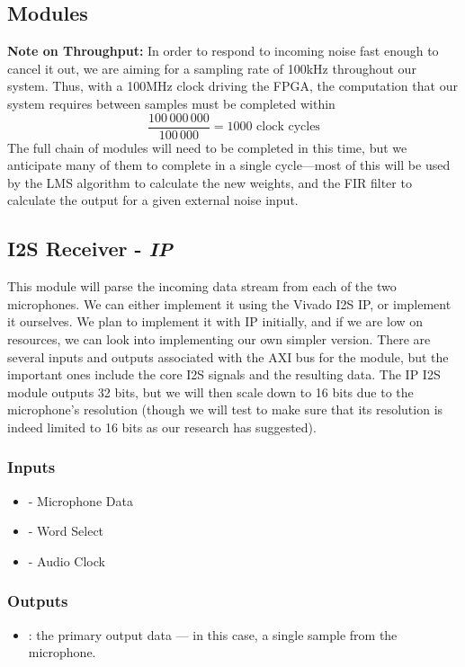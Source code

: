 \documentclass{fpgairpods}
\begin{document}
\newpage
\begin{multicols*}{2}
\section{Modules}
\textbf{Note on Throughput:} In order to respond to incoming noise fast enough to cancel it out, we are aiming for a sampling rate of 100kHz throughout our system. Thus, with a 100MHz clock driving the FPGA, the computation that our system requires between samples must be completed within
\[ \frac{100\,000\,000}{100\,000} = 1000 \text{ clock cycles} \]
The full chain of modules will need to be completed in this time, but we anticipate many of them to complete in a single cycle---most of this will be used by the LMS algorithm to calculate the new weights, and the FIR filter to calculate the output for a given external noise input.


\subsection{I2S Receiver - \textit{IP}}
This module will parse the incoming data stream from each of the two microphones. We can either implement it using the Vivado I2S IP, or implement it ourselves. We plan to implement it with IP initially, and if we are low on resources, we can look into implementing our own simpler version. There are several inputs and outputs associated with the AXI bus for the module, but the important ones include the core I2S signals and the resulting data. The IP I2S module outputs 32 bits, but we will then scale down to 16 bits due to the microphone's resolution (though we will test to make sure that its resolution is indeed limited to 16 bits as our research has suggested). 
\subsubsection{Inputs}
\begin{itemize}
    \item {} - Microphone Data
    \item {} - Word Select
    \item {} - Audio Clock
\end{itemize}
\subsubsection{Outputs}
\begin{itemize}
    \item {}: the primary output data --- in this case, a single sample from the microphone.
\end{itemize}

\end{multicols*}
\end{document}
